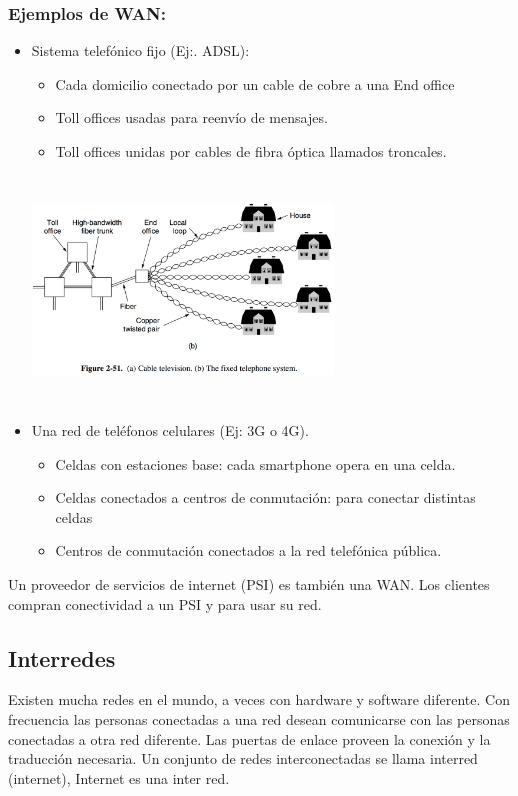 \documentclass[10pt,a4paper]{report}
\begin{document}
\subsubsection{Ejemplos de WAN:}
\begin{itemize}
\item Sistema telefónico fijo (Ej:. ADSL):
\begin{itemize}
	\item Cada domicilio conectado por un cable de cobre a una End office
 	\item Toll offices usadas para reenvío de mensajes.
 	\item Toll offices unidas por cables de fibra óptica llamados troncales.
\end{itemize}	

\begin{center} 
	\includegraphics[width=8cm, height=6cm]{./imagenes/telefonico.png} 
\end{center}

\item Una red de teléfonos celulares (Ej: 3G o 4G).
\begin{itemize}
	\item Celdas con estaciones base: cada smartphone opera en una celda.
	\item Celdas conectados a centros de conmutación: para conectar distintas celdas
 	\item Centros de conmutación conectados a la red telefónica pública.
\end{itemize}

\end{itemize}

\par Un proveedor de servicios de internet (PSI) es también una WAN. Los clientes compran conectividad a un PSI y para usar su red.

\subsection{Interredes}
\par Existen mucha redes en el mundo, a veces con hardware y software diferente. 
Con frecuencia las personas conectadas a una red desean comunicarse con las 
personas conectadas a otra red diferente. Las puertas de enlace proveen la conexión y 
la traducción necesaria. Un conjunto de redes interconectadas se llama interred 
(internet), Internet es una inter red.
\end{document}
